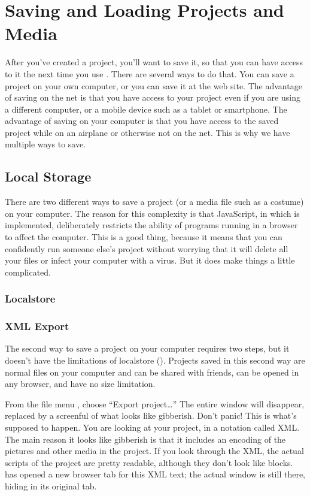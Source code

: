 \documentclass{report}
\begin{document}
\chapter{Saving and Loading Projects and Media}

After you've created a project, you'll want to save it, so that you can have access to it the next time you use \Snap{}. There are several ways to do that. You can save a project on your own computer, or you can save it at the \Snap{} web site. The advantage of saving on the net is that you have access to your project even if you are using a different computer, or a mobile device such as a tablet or smartphone. The advantage of saving on your computer is that you have access to the saved project while on an airplane or otherwise not on the net. This is why we have multiple ways to save.

\section{Local Storage}

There are two different ways to save a project (or a media file such as a costume) on your computer. The reason for this complexity is that JavaScript, in which \Snap{} is implemented, deliberately restricts the ability of programs running in a browser to affect the computer. This is a good thing, because it means that you can confidently run someone else's \Snap{} project without worrying that it will delete all your files or infect your computer with a virus. But it does make things a little complicated.

\subsection{Localstore}

{\Huge \TODO{}}

\subsection{XML Export}

The second way to save a project on your computer requires two steps, but it doesn't have the limitations of localstore (). Projects saved in this second way are normal files on your computer and can be shared with friends, can be opened in any browser, and have no size limitation.

From the file menu , choose ``Export project\ldots'' The entire \Snap{} window will disappear, replaced by a screenful of what looks like gibberish. Don't panic! This is what's supposed to happen. You are looking at your project, in a notation called XML. The main reason it looks like gibberish is that it includes an encoding of the pictures and other media in the project. If you look through the XML, the actual scripts of the project are pretty readable, although they don't look like \Snap{} blocks. \Snap{} has opened a new browser tab for this XML text; the actual \Snap{} window is still there, hiding in its original tab.
\end{document}
